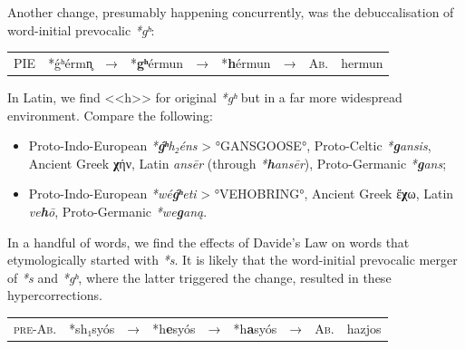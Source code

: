 \documentclass[svgnames,x11names,b5paper]{book}
\begin{document}
        Another change, presumably happening concurrently, was the debuccalisation of word-initial prevocalic \textit{*gʰ}:

            \begin{table}[H]
                \begin{center}
                \begin{tabular}{llcllllll}
                \textsc{PIE} & *ǵʰérmn̥ & → & *\textbf{gʰ}érmun & → & *\textbf{h}érmun & → & \textsc{Ab.} & hermun\\
                \end{tabular}
                \end{center}
                \end{table}
        
            In Latin, we find <<h>> for original \textit{*gʰ} but in a far more widespread environment. Compare the following:
\begin{itemize}
\item  Proto-Indo-European \textit{*\textbf{ǵʰ}h₂éns} > °GANSGOOSE°, Proto-Celtic \textit{*\textbf{g}ansis}, Ancient Greek \textbf{χ}ήν, Latin \textit{ansēr} (through \textit{*\textbf{h}ansēr}), Proto-Germanic \textit{*\textbf{g}ans};\\
\item  Proto-Indo-European \textit{*wé\textbf{ǵʰ}eti} > °VEHOBRING°, Ancient Greek ἔ\textbf{χ}ω, Latin \textit{ve\textbf{h}ō}, Proto-Germanic \textit{*we\textbf{g}aną}.\\
\end{itemize}

        In a handful of words, we find the effects of Davide's Law on words that etymologically started with \textit{*s}. It is likely that the word-initial prevocalic merger of \textit{*s} and \textit{*gʰ}, where the latter triggered the change, resulted in these hypercorrections.

            \begin{table}[H]
                \begin{center}
                \begin{tabular}{llcllllll}
                \textsc{pre-Ab.} & *sh₁syós & → & *h\textbf{e}syós & → & *h\textbf{a}syós & → & \textsc{Ab.} & hazjos\\
                \end{tabular}
                \end{center}
                \end{table}
        
\end{document}
